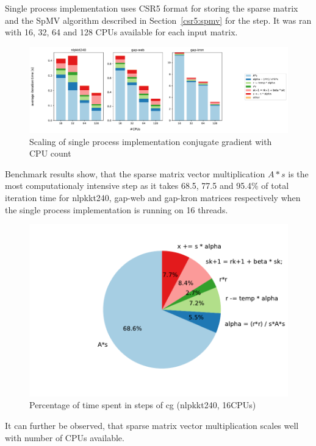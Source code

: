 \documentclass[thesis=M,english]{FITthesis}[2019/12/23]
\begin{document}
Single process implementation uses CSR5 format for storing the sparse matrix and the
SpMV algorithm  described in Section~\ref{csr5:spmv} for the  step. It was ran
with 16, 32, 64 and 128 CPUs available for each input matrix.

\begin{figure}[htp]
    \centering
    \includegraphics[scale=0.35]{static/single_process.pdf}
    \caption{Scaling of single process implementation conjugate gradient with CPU count}
\end{figure}

Benchmark results show, that the sparse matrix vector multiplication
$A * s$ is the most computationaly intensive step as it takes 68.5, 77.5 and 95.4\% of
total iteration time for nlpkkt240, gap-web and gap-kron matrices respectively when
the single process implementation is running on 16 threads.


\begin{figure}[htp]
    \centering
    \includegraphics[scale=0.6]{static/cg_sp_nlpkkt240_16.pdf}
    \caption{Percentage of time spent in steps of cg (nlpkkt240, 16CPUs)}
\end{figure}


It can further be observed, that sparse matrix vector multiplication scales well with
number of CPUs available.
\end{document}
